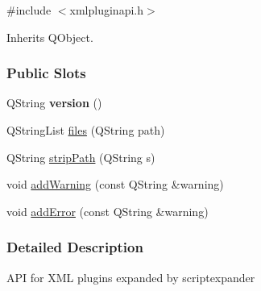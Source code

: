 \hypertarget{classapex_1_1_x_m_l_plugin_a_p_i}{
\label{classapex_1_1_x_m_l_plugin_a_p_i}
}


{\ttfamily \#include $<$xmlpluginapi.\-h$>$}



Inherits Q\-Object.

\subsubsection*{Public Slots}
\begin{DoxyCompactItemize}
\item
\hypertarget{classapex_1_1_x_m_l_plugin_a_p_i_a4f452e83f0accd9ea14922d0782e5e8d}{Q\-String {\bfseries version} ()}\label{classapex_1_1_x_m_l_plugin_a_p_i_a4f452e83f0accd9ea14922d0782e5e8d}

\item
Q\-String\-List \hyperlink{classapex_1_1_x_m_l_plugin_a_p_i_ac065b51008c78494cd9978b67eb1b65b}{files} (Q\-String path)
\item
Q\-String \hyperlink{classapex_1_1_x_m_l_plugin_a_p_i_af9c8ce2ef69a723d1353c3120cac8547}{strip\-Path} (Q\-String s)
\item
void \hyperlink{classapex_1_1_x_m_l_plugin_a_p_i_abb19cffd766d06855f99eeb5886bdbc5}{add\-Warning} (const Q\-String \&warning)
\item
void \hyperlink{classapex_1_1_x_m_l_plugin_a_p_i_a5c808692c00880818633018023e21ad3}{add\-Error} (const Q\-String \&warning)
\end{DoxyCompactItemize}


\subsubsection{Detailed Description}
A\-P\-I for X\-M\-L plugins expanded by scriptexpander

